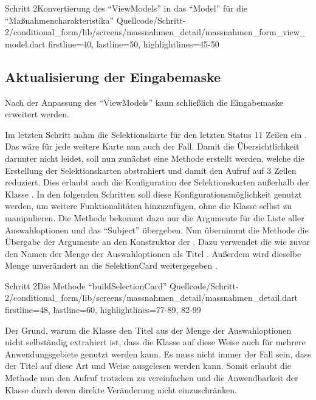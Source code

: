 \begin{alexlisting}{Schritt 2}{Konvertierung des \enquote{ViewModels} in das \enquote{Model} für die \enquote{Maßnahmencharakteristika}}
  {Quellcode/Schritt-2/conditional_form/lib/screens/massnahmen_detail/massnahmen_form_view_model.dart}
  {firstline=40, lastline=50, highlightlines={45-50}}
  \label{lst:Schritt2KonvertierungDesViewModelsInDasModel}
\end{alexlisting}

\subsection{Aktualisierung der Eingabemaske}

Nach der Anpassung des \enquote{ViewModels} kann schließlich die Eingabemaske erweitert werden.

Im letzten Schritt nahm die Selektionskarte für den letzten Status 11 Zeilen ein . 
Das wäre für jede weitere Karte nun auch der Fall.
Damit die Übersichtlichkeit darunter nicht leidet, soll nun zunächst eine Methode erstellt werden, welche die Erstellung der Selektionskarten abstrahiert und damit den Aufruf auf 3 Zeilen reduziert.
Dies erlaubt auch die Konfiguration der Selektionskarten außerhalb der Klasse .
In den folgenden Schritten soll diese Konfigurationsmöglichkeit genutzt werden, um weitere Funktionalitäten hinzuzufügen, ohne die Klasse selbst zu manipulieren.
Die Methode  bekommt dazu nur die Argumente für die Liste aller Auswahloptionen   und das \enquote{Subject}   übergeben.
Nun übernimmt die Methode die Übergabe der Argumente an den Konstruktor der .
Dazu verwendet die  wie zuvor den Namen der Menge der Auswahloptionen als Titel .
Außerdem wird dieselbe Menge unverändert an die SelektionCard weitergegeben .

\begin{alexlisting}{Schritt 2}{Die Methode \enquote{buildSelectionCard}}
  {Quellcode/Schritt-2/conditional_form/lib/screens/massnahmen_detail/massnahmen_detail.dart}
  {firstline=48, lastline=60, highlightlines={77-89, 82-99}}
  \label{lst:Schritt2MassnahmencharakteristikaSelektionskartenWerdenErgaenzt}
\end{alexlisting}

Der Grund, warum die Klasse  den Titel aus der Menge der Auswahloptionen nicht selbständig extrahiert ist, dass die Klasse auf diese Weise auch für mehrere Anwendungsgebiete genutzt werden kann.
Es muss nicht immer der Fall sein, dass der Titel auf diese Art und Weise ausgelesen werden kann.
Somit erlaubt die Methode  nun den Aufruf trotzdem zu vereinfachen und die Anwendbarkeit der Klasse  durch deren direkte Veränderung nicht einzuschränken.

